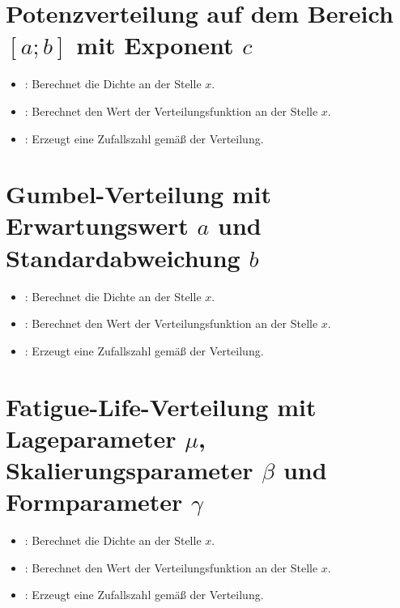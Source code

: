 \section{Potenzverteilung auf dem Bereich \texorpdfstring{$[a;b]$}{[a;b]} mit Exponent \texorpdfstring{$c$}{c}}

\begin{itemize}

\item
{}:
Berechnet die Dichte an der Stelle $x$.

\item
{}:
Berechnet den Wert der Verteilungsfunktion an der Stelle $x$.

\item
{}:
Erzeugt eine Zufallszahl gemäß der Verteilung.

\end{itemize}



\section{Gumbel-Verteilung mit Erwartungswert \texorpdfstring{$a$}{a} und Standardabweichung \texorpdfstring{$b$}{b}}

\begin{itemize}

\item
{}:
Berechnet die Dichte an der Stelle $x$.

\item
{}:
Berechnet den Wert der Verteilungsfunktion an der Stelle $x$.

\item
{}:
Erzeugt eine Zufallszahl gemäß der Verteilung.

\end{itemize}



\section{Fatigue-Life-Verteilung mit Lageparameter \texorpdfstring{$\mu$}{mu}, Skalierungsparameter \texorpdfstring{$\beta$}{beta} und Formparameter \texorpdfstring{$\gamma$}{gamma}}

\begin{itemize}

\item
{}:
Berechnet die Dichte an der Stelle $x$.

\item
{}:
Berechnet den Wert der Verteilungsfunktion an der Stelle $x$.

\item
{}:
Erzeugt eine Zufallszahl gemäß der Verteilung.

\end{itemize}



